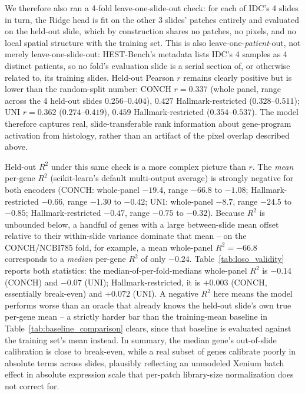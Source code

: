 \documentclass[11pt]{article}
\begin{document}
We therefore also ran a 4-fold leave-one-slide-out check: for each of IDC's 4 slides in turn, the Ridge head is fit on the other 3 slides' patches entirely and evaluated on the held-out slide, which by construction shares no patches, no pixels, and no local spatial structure with the training set. This is also leave-one-\emph{patient}-out, not merely leave-one-slide-out: HEST-Bench's metadata lists IDC's 4 samples as 4 distinct patients, so no fold's evaluation slide is a serial section of, or otherwise related to, its training slides. Held-out Pearson $r$ remains clearly positive but is lower than the random-split number: CONCH $r=0.337$ (whole panel, range across the 4 held-out slides $0.256$--$0.404$), $0.427$ Hallmark-restricted ($0.328$--$0.511$); UNI $r=0.362$ ($0.274$--$0.419$), $0.459$ Hallmark-restricted ($0.354$--$0.537$). The model therefore captures real, slide-transferable rank information about gene-program activation from histology, rather than an artifact of the pixel overlap described above.

Held-out $R^2$ under this same check is a more complex picture than $r$. The \emph{mean} per-gene $R^2$ (scikit-learn's default multi-output average) is strongly negative for both encoders (CONCH: whole-panel $-19.4$, range $-66.8$ to $-1.08$; Hallmark-restricted $-0.66$, range $-1.30$ to $-0.42$; UNI: whole-panel $-8.7$, range $-24.5$ to $-0.85$; Hallmark-restricted $-0.47$, range $-0.75$ to $-0.32$). Because $R^2$ is unbounded below, a handful of genes with a large between-slide mean offset relative to their within-slide variance dominate that mean -- on the CONCH/NCBI785 fold, for example, a mean whole-panel $R^2=-66.8$ corresponds to a \emph{median} per-gene $R^2$ of only $-0.24$. Table~\ref{tab:loso_validity} reports both statistics: the median-of-per-fold-medians whole-panel $R^2$ is $-0.14$ (CONCH) and $-0.07$ (UNI); Hallmark-restricted, it is $+0.003$ (CONCH, essentially break-even) and $+0.072$ (UNI). A negative $R^2$ here means the model performs worse than an oracle that already knows the held-out slide's own true per-gene mean -- a strictly harder bar than the training-mean baseline in Table~\ref{tab:baseline_comparison} clears, since that baseline is evaluated against the training set's mean instead. In summary, the median gene's out-of-slide calibration is close to break-even, while a real subset of genes calibrate poorly in absolute terms across slides, plausibly reflecting an unmodeled Xenium batch effect in absolute expression scale that per-patch library-size normalization does not correct for.
\end{document}

